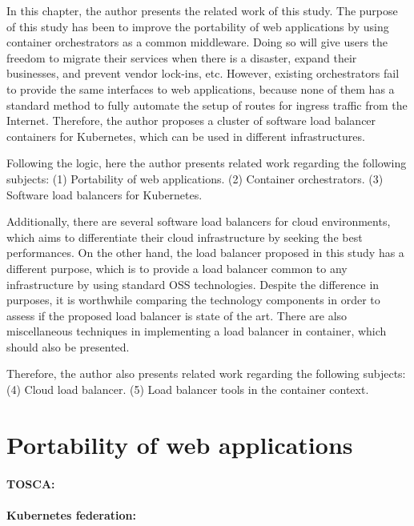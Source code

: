 
In this chapter, the author presents the related work of this study.
The purpose of this study has been to improve the portability of web applications by using container orchestrators as a common middleware.
Doing so will give users the freedom to migrate their services when there is a disaster, expand their businesses, and prevent vendor lock-ins, etc.
However, existing orchestrators fail to provide the same interfaces to web applications, because none of them has a standard method to fully automate the setup of routes for ingress traffic from the Internet.
Therefore, the author proposes a cluster of software load balancer containers for Kubernetes, which can be used in different infrastructures.

Following the logic, here the author presents related work regarding the following subjects:
(1) Portability of web applications.
(2) Container orchestrators.
(3) Software load balancers for Kubernetes.

Additionally, there are several software load balancers for cloud environments, which aims to differentiate their cloud infrastructure by seeking the best performances.
On the other hand, the load balancer proposed in this study has a different purpose, which is to provide a load balancer common to any infrastructure by using standard OSS technologies.
Despite the difference in purposes, it is worthwhile comparing the technology components in order to assess if the proposed load balancer is state of the art.
There are also miscellaneous techniques in implementing a load balancer in container, which should also be presented.

Therefore, the author also presents related work regarding the following subjects:
(4) Cloud load balancer.
(5) Load balancer tools in the container context.

\section{Portability of web applications}

\paragraph{\bf TOSCA:}

\paragraph{\bf Kubernetes federation:}


